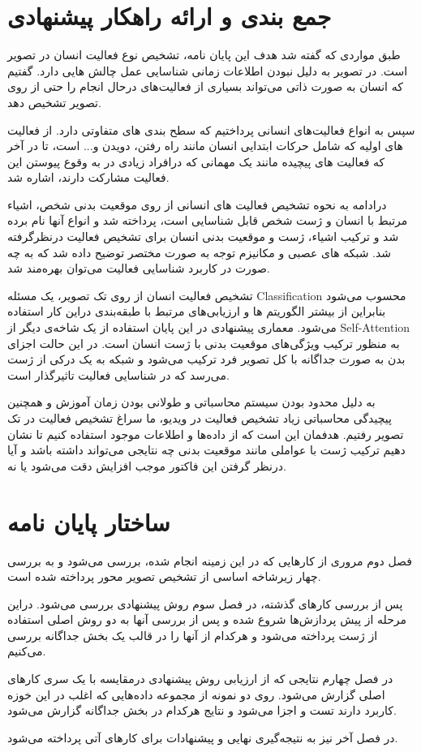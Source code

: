 \section{جمع بندی و ارائه راهکار پیشنهادی} 

طبق مواردی که گفته شد هدف این پایان نامه، تشخیص نوع فعالیت انسان در تصویر است. در تصویر به دلیل نبودن اطلاعات زمانی شناسایی عمل چالش هایی دارد. گفتیم که انسان به صورت ذاتی می‌تواند بسیاری از فعالیت‌های درحال انجام را حتی از روی تصویر تشخیص دهد.

سپس به انواع فعالیت‌های انسانی پرداختیم که سطح بندی های متفاوتی دارد. از فعالیت های اولیه که شامل حرکات ابتدایی انسان مانند راه رفتن،‌ دویدن و... است، تا در آخر که فعالیت های پیچیده مانند یک مهمانی که درافراد زیادی در به وقوع پیوستن این فعالیت مشارکت دارند، اشاره شد.

درادامه به نحوه تشخیص فعالیت های انسانی از روی موقعیت بدنی شخص، اشیاء مرتبط با انسان و ژست شخص قابل شناسایی است،‌ پرداخته شد و انواع آنها نام برده شد و ترکیب اشیاء، ژست و موقعیت بدنی انسان برای تشخیص فعالیت درنظرگرفته شد. شبکه های عصبی و مکانیزم توجه به صورت مختصر توضیح داده شد که به چه صورت در کاربرد شناسایی فعالیت می‌توان بهره‌مند شد.

تشخیص فعالیت انسان از روی تک تصویر،‌ یک مسئله %
\gls{Classification}
 محسوب می‌شود بنابراین از بیشتر الگوریتم ها و ارزیابی‌های مرتبط با طبقه‌بندی دراین کار استفاده می‌شود. معماری پیشنهادی در این پایان استفاده از یک شاخه‌ی دیگر از %
 \gls{Self-Attention}
  به منظور ترکیب ویژگی‌های موقعیت بدنی با ژست انسان است. در این حالت اجزای بدن به صورت جداگانه با کل تصویر فرد ترکیب می‌شود و شبکه به یک درکی از ژست می‌رسد که در شناسایی فعالیت تاثیرگذار است.
  
 به دلیل محدود بودن سیستم محاسباتی و طولانی بودن زمان آموزش و همچنین پیچیدگی محاسباتی زیاد تشخیص فعالیت در ویدیو،‌ ما سراغ تشخیص فعالیت در تک تصویر رفتیم. هدفمان این است که از داده‌ها و اطلاعات موجود استفاده کنیم تا نشان دهیم ترکیب ژست با عواملی مانند موقعیت بدنی چه نتایجی می‌تواند داشته باشد و آیا درنظر گرفتن این فاکتور موجب افزایش دقت می‌شود یا نه.

\section{ساختار پایان نامه} 

فصل دوم مروری از کارهایی که در این زمینه انجام شده، بررسی می‌شود و به بررسی چهار زیرشاخه اساسی از تشخیص تصویر محور پرداخته شده است.

پس از بررسی کارهای گذشته، در فصل سوم روش پیشنهادی بررسی می‌شود. دراین مرحله از پیش پردازش‌ها شروع شده و پس از بررسی آنها به دو روش اصلی استفاده از ژست پرداخته می‌شود و هرکدام از آنها را در قالب یک بخش جداگانه بررسی می‌کنیم.

در فصل چهارم نتایجی که از ارزیابی روش پیشنهادی درمقایسه با یک سری کارهای اصلی گزارش می‌شود. روی دو نمونه از مجموعه ‌داده‌هایی که اغلب در این خوزه کاربرد دارند تست و اجزا می‌شود و نتایج هرکدام در بخش جداگانه گزارش می‌شود.

در فصل آخر نیز به نتیجه‌گیری نهایی و پیشنهادات برای کارهای آتی پرداخته می‌شود.

